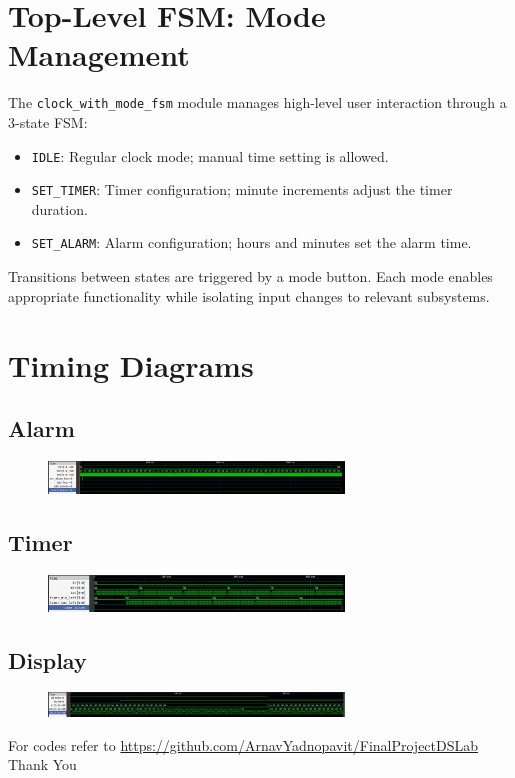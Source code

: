 \documentclass[11pt]{article}
\begin{document}
\section{Top-Level FSM: Mode Management}
The \texttt{clock\_with\_mode\_fsm} module manages high-level user interaction through a 3-state FSM:
\begin{itemize}
  \item \texttt{IDLE}: Regular clock mode; manual time setting is allowed.
  \item \texttt{SET\_TIMER}: Timer configuration; minute increments adjust the timer duration.
  \item \texttt{SET\_ALARM}: Alarm configuration; hours and minutes set the alarm time.
\end{itemize}

Transitions between states are triggered by a mode button. Each mode enables appropriate functionality while isolating input changes to relevant subsystems.
\section{Timing Diagrams}
\subsection{Alarm}
\begin{figure}[H]
    \centering
    \includegraphics[width=0.7\textwidth]{figs/alarmtest.png}
\end{figure}
\subsection{Timer}
\begin{figure}[H]
    \centering
    \includegraphics[width=0.7\textwidth]{figs/timertest.png}
\end{figure}
\subsection{Display}
\begin{figure}[H]
    \centering
    \includegraphics[width=0.7\textwidth]{figs/disptest.png}
\end{figure}
For codes refer to \url{https://github.com/ArnavYadnopavit/FinalProjectDSLab}\\

\centering
Thank You
\end{document}
